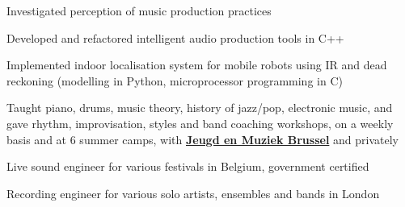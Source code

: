 \documentclass[letterpaper]{deedy-resume} %
\begin{document}
{\begin{minipage}[t]{0.66\textwidth}

\hspace{-0.1cm}
\begin{tightitemize}
\item Investigated perception of music production practices
\item Developed and refactored intelligent audio production tools in C++
\end{tightitemize}


\hspace{-0.1cm} 
\begin{tightitemize}
\item Implemented indoor localisation system for mobile robots using IR and dead reckoning (modelling in Python, microprocessor programming in C)
\end{tightitemize}



\hspace{-0.1cm}
\begin{tightitemize}
\item Taught piano, drums, music theory, history of jazz/pop, electronic music, and gave rhythm, improvisation, styles and band coaching workshops, on a weekly basis and at 6 summer camps, with \href{http://www.jeugdenmuziekbrussel.be}{\textbf{Jeugd en Muziek Brussel}} and privately
\item Live sound engineer for various festivals in Belgium, government certified
\item Recording engineer for various solo artists, ensembles and bands in London
\end{tightitemize}



\end{minipage}}
\end{document}
